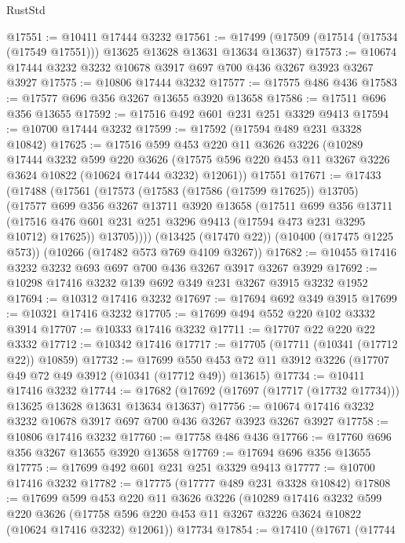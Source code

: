 \begin{lexlean}{RustStd}
\begin{coremodule}
@17551 := @10411 @17444 @3232
@17561 := @17499 (@17509 (@17514 (@17534 (@17549 @17551))) @13625 @13628 @13631 @13634 @13637)
@17573 := @10674 @17444 @3232 @3232 @10678 @3917 @697 @700 @436 @3267 @3923 @3267 @3927
@17575 := @10806 @17444 @3232
@17577 := @17575 @486 @436
@17583 := @17577 @696 @356 @3267 @13655 @3920 @13658
@17586 := @17511 @696 @356 @13655
@17592 := @17516 @492 @601 @231 @251 @3329 @9413
@17594 := @10700 @17444 @3232
@17599 := @17592 (@17594 @489 @231 @3328 @10842)
@17625 := @17516
    @599
    @453
    @220
    @11
    @3626
    @3226
    (@10289
      @17444
      @3232
      @599
      @220
      @3626
      (@17575 @596 @220 @453 @11 @3267 @3226 @3624 @10822 (@10624 @17444 @3232) @12061))
    @17551
@17671 := @17433
    (@17488
      (@17561
        (@17573
          (@17583 (@17586 (@17599 @17625)) @13705)
          (@17577
            @699
            @356
            @3267
            @13711
            @3920
            @13658
            (@17511
              @699
              @356
              @13711
              (@17516 @476 @601 @231 @251 @3296 @9413 (@17594 @473 @231 @3295 @10712) @17625))
            @13705))))
    (@13425 (@17470 @22))
    (@10400 (@17475 @1225 @573))
    (@10266 (@17482 @573 @769 @4109 @3267))
@17682 := @10455 @17416 @3232 @3232 @693 @697 @700 @436 @3267 @3917 @3267 @3929
@17692 := @10298 @17416 @3232 @139 @692 @349 @231 @3267 @3915 @3232 @1952
@17694 := @10312 @17416 @3232
@17697 := @17694 @692 @349 @3915
@17699 := @10321 @17416 @3232
@17705 := @17699 @494 @552 @220 @102 @3332 @3914
@17707 := @10333 @17416 @3232
@17711 := @17707 @22 @220 @22 @3332
@17712 := @10342 @17416
@17717 := @17705 (@17711 (@10341 (@17712 @22)) @10859)
@17732 := @17699
    @550
    @453
    @72
    @11
    @3912
    @3226
    (@17707 @49 @72 @49 @3912 (@10341 (@17712 @49)) @13615)
@17734 := @10411 @17416 @3232
@17744 := @17682 (@17692 (@17697 (@17717 (@17732 @17734))) @13625 @13628 @13631 @13634 @13637)
@17756 := @10674 @17416 @3232 @3232 @10678 @3917 @697 @700 @436 @3267 @3923 @3267 @3927
@17758 := @10806 @17416 @3232
@17760 := @17758 @486 @436
@17766 := @17760 @696 @356 @3267 @13655 @3920 @13658
@17769 := @17694 @696 @356 @13655
@17775 := @17699 @492 @601 @231 @251 @3329 @9413
@17777 := @10700 @17416 @3232
@17782 := @17775 (@17777 @489 @231 @3328 @10842)
@17808 := @17699
    @599
    @453
    @220
    @11
    @3626
    @3226
    (@10289
      @17416
      @3232
      @599
      @220
      @3626
      (@17758 @596 @220 @453 @11 @3267 @3226 @3624 @10822 (@10624 @17416 @3232) @12061))
    @17734
@17854 := @17410
    (@17671
      (@17744

\end{coremodule}
\end{lexlean}

